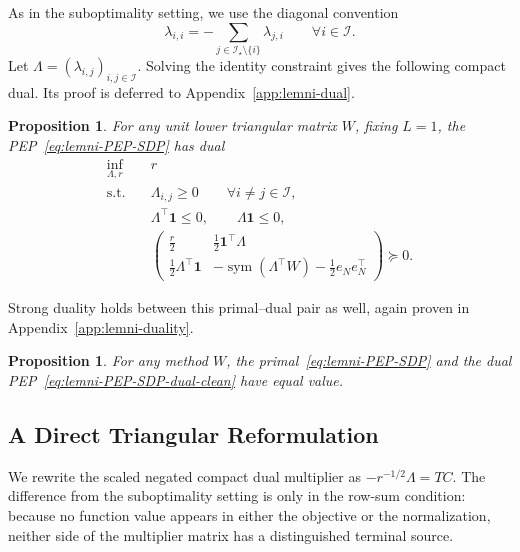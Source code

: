 \documentclass[11pt]{article}
\newtheorem{proposition}[thm]{Proposition}
\begin{document}
As in the suboptimality setting, we use the diagonal convention
\begin{equation}\label{eq:lemni-lambda-diagonal}
    \lambda_{i,i}
    =-\sum_{j\in\mathcal I_\star\setminus\{i\}}\lambda_{j,i}
    \qquad \forall i\in\mathcal I.
\end{equation}
Let $\Lambda=(\lambda_{i,j})_{i,j\in\mathcal I}$. Solving the identity
constraint gives the following compact dual. Its proof is deferred to
Appendix~\ref{app:lemni-dual}.
\begin{proposition}\label{prop:lemni-dual}
For any unit lower triangular matrix $W$, fixing $L=1$, the
PEP~\eqref{eq:lemni-PEP-SDP} has dual
\begin{equation}\label{eq:lemni-PEP-SDP-dual-clean}
\begin{aligned}
    \inf_{\Lambda,r}\quad &r\\
    \mathrm{s.t.}\quad
    &\Lambda_{i,j}\geq0
    \qquad \forall i\neq j\in\mathcal I,\\
    &\Lambda^\top\mathbf1\leq0,
    \qquad
    \Lambda\mathbf1\leq0,\\
    &\begin{pmatrix}
        \frac r2 & \frac12\mathbf1^\top\Lambda\\[1mm]
        \frac12\Lambda^\top\mathbf1
        &-\operatorname{sym}(\Lambda^\top W)-\frac12e_Ne_N^\top
    \end{pmatrix}\succeq0.
\end{aligned}
\end{equation}
\end{proposition}
\noindent Strong duality holds between this primal--dual pair as well, again proven in Appendix~\ref{app:lemni-duality}.
\begin{proposition}\label{prop:lemni-duality}
For any method $W$, the primal~\eqref{eq:lemni-PEP-SDP} and the dual
PEP~\eqref{eq:lemni-PEP-SDP-dual-clean} have equal value.
\end{proposition}

\subsection{A Direct Triangular Reformulation}

We rewrite the scaled negated compact dual multiplier as
$-r^{-1/2}\Lambda=TC$.
The difference from the suboptimality setting is only in the row-sum
condition: because no function value appears in either the objective or the
normalization, neither side of the multiplier matrix has a distinguished
terminal source.
\end{document}
